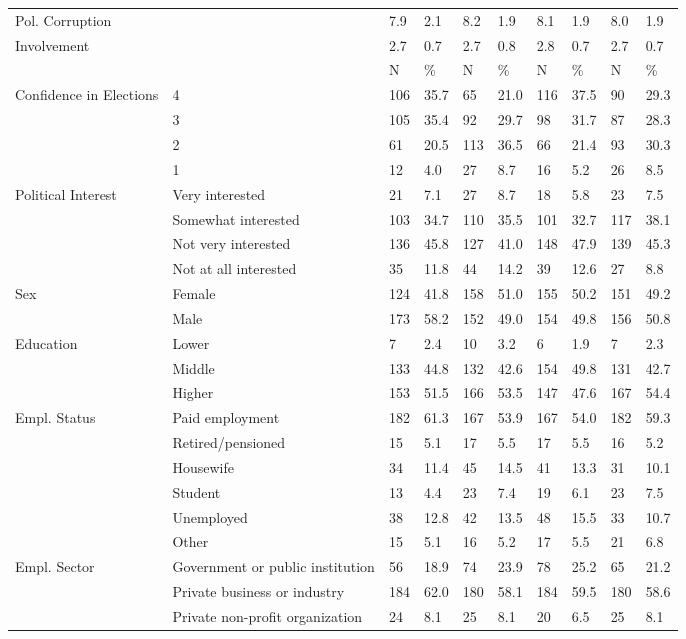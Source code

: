 \begin{table}
\begin{tabular}[t]{llllllllll}
Pol. Corruption &  & 7.9 & 2.1 & 8.2 & 1.9 & 8.1 & 1.9 & 8.0 & 1.9\\
Involvement &  & 2.7 & 0.7 & 2.7 & 0.8 & 2.8 & 0.7 & 2.7 & 0.7\\
\midrule
 &  & N & \% & N & \% & N & \% & N & \%\\
Confidence in Elections & 4 & 106 & 35.7 & 65 & 21.0 & 116 & 37.5 & 90 & 29.3\\
 & 3 & 105 & 35.4 & 92 & 29.7 & 98 & 31.7 & 87 & 28.3\\
 & 2 & 61 & 20.5 & 113 & 36.5 & 66 & 21.4 & 93 & 30.3\\
 & 1 & 12 & 4.0 & 27 & 8.7 & 16 & 5.2 & 26 & 8.5\\
Political Interest & Very interested & 21 & 7.1 & 27 & 8.7 & 18 & 5.8 & 23 & 7.5\\
 & Somewhat interested & 103 & 34.7 & 110 & 35.5 & 101 & 32.7 & 117 & 38.1\\
 & Not very interested & 136 & 45.8 & 127 & 41.0 & 148 & 47.9 & 139 & 45.3\\
 & Not at all interested & 35 & 11.8 & 44 & 14.2 & 39 & 12.6 & 27 & 8.8\\
Sex & Female & 124 & 41.8 & 158 & 51.0 & 155 & 50.2 & 151 & 49.2\\
 & Male & 173 & 58.2 & 152 & 49.0 & 154 & 49.8 & 156 & 50.8\\
Education & Lower & 7 & 2.4 & 10 & 3.2 & 6 & 1.9 & 7 & 2.3\\
 & Middle & 133 & 44.8 & 132 & 42.6 & 154 & 49.8 & 131 & 42.7\\
 & Higher & 153 & 51.5 & 166 & 53.5 & 147 & 47.6 & 167 & 54.4\\
Empl. Status & Paid employment & 182 & 61.3 & 167 & 53.9 & 167 & 54.0 & 182 & 59.3\\
 & Retired/pensioned & 15 & 5.1 & 17 & 5.5 & 17 & 5.5 & 16 & 5.2\\
 & Housewife & 34 & 11.4 & 45 & 14.5 & 41 & 13.3 & 31 & 10.1\\
 & Student & 13 & 4.4 & 23 & 7.4 & 19 & 6.1 & 23 & 7.5\\
 & Unemployed & 38 & 12.8 & 42 & 13.5 & 48 & 15.5 & 33 & 10.7\\
 & Other & 15 & 5.1 & 16 & 5.2 & 17 & 5.5 & 21 & 6.8\\
Empl. Sector & Government or public institution & 56 & 18.9 & 74 & 23.9 & 78 & 25.2 & 65 & 21.2\\
 & Private business or industry & 184 & 62.0 & 180 & 58.1 & 184 & 59.5 & 180 & 58.6\\
 & Private non-profit organization & 24 & 8.1 & 25 & 8.1 & 20 & 6.5 & 25 & 8.1\\

\end{tabular}
\end{table}
